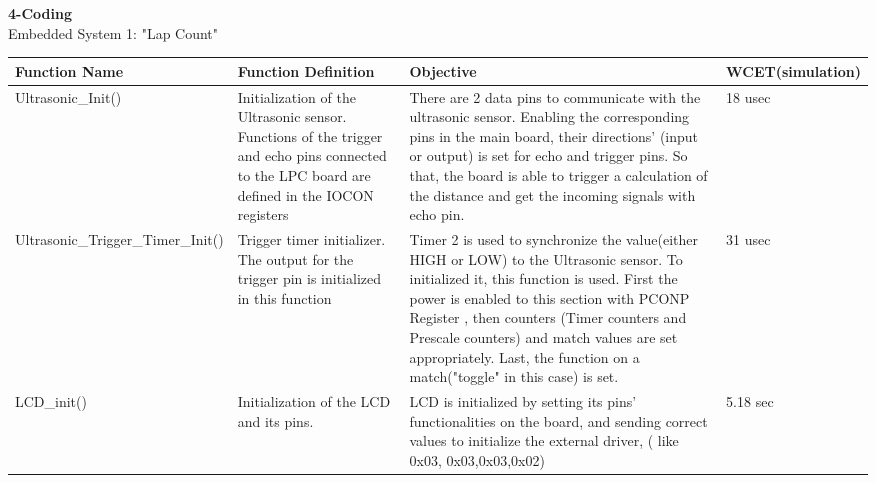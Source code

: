 \documentclass{article}
\begin{document}
\clearpage
{\huge\textbf {4-Coding}}
\\
{\huge {Embedded System 1: "Lap Count"}}
\\
\begin{tabular}{| C{4cm} | C{4cm} | C{4cm} | C{2cm} |}
\hline
\textbf{Function Name} &\textbf{Function Definition}  & \textbf{Objective} &\textbf{WCET}\linebreak(simulation)\\
\hline
Ultrasonic\_Init() & Initialization of the Ultrasonic sensor. Functions of the trigger
and echo pins connected to the LPC board are defined in the IOCON registers& There are 2 data pins to
communicate with the ultrasonic sensor. Enabling the corresponding pins in the main board, their directions'
(input or output) is set for echo and trigger pins. So that, the board is able to trigger a calculation
of the distance and get the incoming signals with echo pin.& 18 usec\\
\hline
Ultrasonic\_Trigger\_Timer\_Init()&Trigger timer initializer. The output for the trigger pin is
 initialized in this function & Timer 2 is used to synchronize the value(either HIGH or LOW) to the Ultrasonic
 sensor. To initialized it, this function is used. First the power is enabled to this section with PCONP Register
 , then counters (Timer counters and Prescale counters) and match values are set appropriately. Last, the
 function on a match("toggle" in this case) is set. & 31 usec\\
\hline
LCD\_init()&Initialization of the LCD and its pins.& LCD is initialized by setting its pins' functionalities on the board,
and sending correct values to initialize the external driver, ( like 0x03, 0x03,0x03,0x02)&5.18 sec\\
\hline
\end{tabular}
\end{document}
